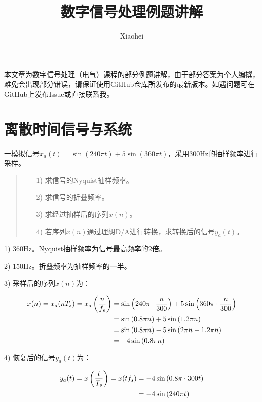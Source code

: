 \documentclass[cn, hazy, blue, normal, 14pt]{elegantnote}
\title{数字信号处理例题讲解}
\author{Xiaohei}
\date{\zhtoday}
\begin{document}
\maketitle

\setlength{\lineskip}{1.5em}
\setlength{\parskip}{0}


本文章为数字信号处理（电气）课程的部分例题讲解，由于部分答案为个人编撰，难免会出现部分错误，请保证使用GitHub仓库所发布的最新版本。如遇问题可在GitHub上发布Issue或直接联系我。


\section{离散时间信号与系统}


\begin{exercise}

一模拟信号$x_a(t)=\sin(240\pi t)+5\sin(360\pi t)$，采用300Hz的抽样频率进行采样。

\begin{quote}
\begin{itemize}
    \item[1)] 求信号的Nyquist抽样频率。
    \item[2)] 求信号的折叠频率。
    \item[3)] 求经过抽样后的序列$x(n)$。
    \item[4)] 若序列$x(n)$通过理想D/A进行转换，求转换后的信号$y_a(t)$。
\end{itemize}
\end{quote}

\end{exercise}

\begin{solution}[print=true]

1) 360Hz。Nyquist抽样频率为信号最高频率的2倍。

2) 150Hz。折叠频率为抽样频率的一半。

3) 采样后的序列$x(n)$为：

\begin{equation}
\notag
\begin{aligned}
    x(n)=x_a(nT_s)=x_a\left(\frac{n}{f_s}\right)&=\sin\left(240\pi\cdot\frac{n}{300}\right)+5\sin\left(360\pi\cdot\frac{n}{300}\right) \\
    &=\sin\left(0.8\pi n\right)+5\sin\left(1.2\pi n\right) \\
    &=\sin\left(0.8\pi n\right)-5\sin\left(2\pi n-1.2\pi n\right) \\
    &=-4\sin\left(0.8\pi n\right)
\end{aligned}
\end{equation}

4) 恢复后的信号$y_a(t)$为：

\begin{equation}
\notag
\begin{aligned}
    y_a(t)=x\left(\frac{t}{T_s}\right)=x(tf_s)&=-4\sin\left(0.8\pi \cdot 300 t\right) \\
    &=-4\sin\left(240\pi t\right)
\end{aligned}
\end{equation}

\end{solution}
\end{document}
